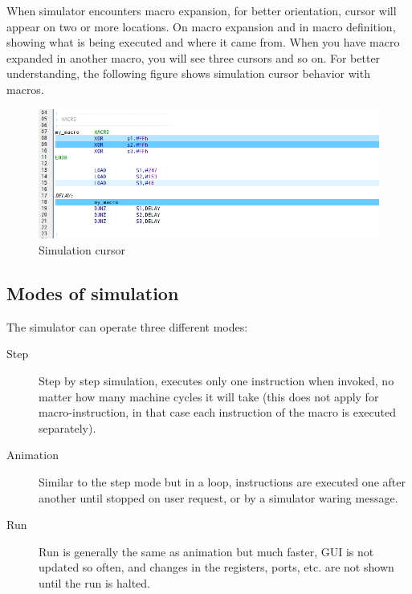         When simulator encounters macro expansion, for better orientation, cursor will appear on two or more locations. On macro expansion and in macro definition, showing what is being executed and where it came from. When you have macro expanded in another macro, you will see three cursors and so on. For better understanding, the following figure shows simulation cursor behavior with macros.
        \begin{figure}[h!]
            \centering
            \includegraphics[width=\textwidth]{img/simulationcursor2.png}
            \caption{Simulation cursor}
        \end{figure}

    \subsection{Modes of simulation}
        The simulator can operate three different modes:
        \begin{description}
            \item [Step]
                Step by step simulation, executes only one instruction when invoked, no matter how many machine cycles it will take (this does not apply for macro-instruction, in that case each instruction of the macro is executed separately).
            \item [Animation]
                Similar to the step mode but in a loop, instructions are executed one after another until stopped on user request, or by a simulator waring message.
            \item [Run]
                Run is generally the same as animation but much faster, GUI is not updated so often, and changes in the registers, ports, etc. are not shown until the run is halted.
        \end{description}
